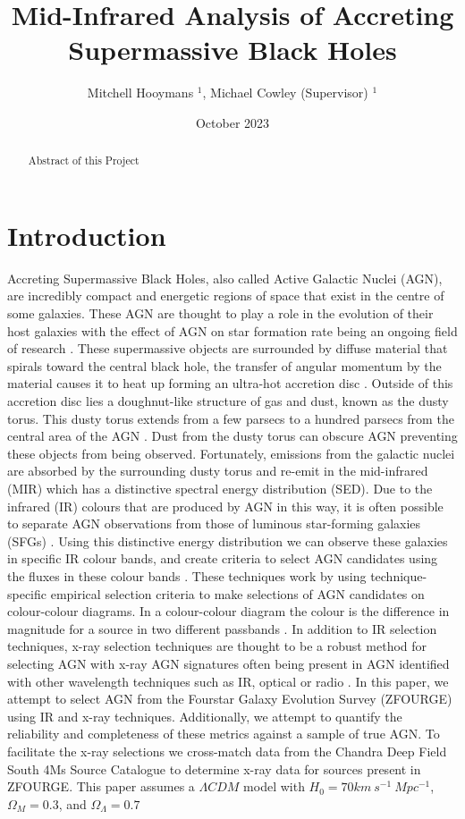 \documentclass[11pt]{iopart}
\date{October 2023}
\begin{document}
\title{Mid-Infrared Analysis of Accreting Supermassive Black Holes}
\author{Mitchell Hooymans $^1$, Michael Cowley (Supervisor) $^1$}
\address{$^1$ Queensland University of Technology, Brisbane, Australia, 4000}

\begin{abstract}
    Abstract of this Project
\end{abstract}

\ioptwocol
\section{Introduction}
Accreting Supermassive Black Holes, also called Active Galactic Nuclei (AGN), are incredibly compact and energetic regions of space that exist in the centre of some galaxies. These AGN are thought to play a role in the evolution of their host galaxies with the effect of AGN on star formation rate being an ongoing field of research \cite{cowley_zfourge_2016}. These supermassive objects are surrounded by diffuse material that spirals toward the central black hole, the transfer of angular momentum by the material causes it to heat up forming an ultra-hot accretion disc \cite{shakura_black_1973}. Outside of this accretion disc lies a doughnut-like structure of gas and dust, known as the dusty torus. This dusty torus extends from a few parsecs to a hundred parsecs from the central area of the AGN \cite{netzer_revisiting_2015}. Dust from the dusty torus can obscure AGN preventing these objects from being observed. Fortunately, emissions from the galactic nuclei are absorbed by the surrounding dusty torus and re-emit in the mid-infrared (MIR) which has a distinctive spectral energy distribution (SED)\cite{lyu_polar_2018}. Due to the infrared (IR) colours that are produced by AGN in this way, it is often possible to separate AGN observations from those of luminous star-forming galaxies (SFGs) \cite{hickox_obscured_2018}. Using this distinctive energy distribution we can observe these galaxies in specific IR colour bands, and create criteria to select AGN candidates using the fluxes in these colour bands \cite{lacy_obscured_2004, stern_midinfrared_2005, donley_identifying_2012, messias_new_2012}. These techniques work by using technique-specific empirical selection criteria to make selections of AGN candidates on colour-colour diagrams. In a colour-colour diagram the colour is the difference in magnitude for a source in two different passbands \cite{bessell_ubvri_1990}. In addition to IR selection techniques, x-ray selection techniques are thought to be a robust method for selecting AGN with x-ray AGN signatures often being present in AGN identified with other wavelength techniques such as IR, optical or radio \cite{brandt_cosmic_2015}. In this paper, we attempt to select AGN from the Fourstar Galaxy Evolution Survey (ZFOURGE) \cite{straatman_fourstar_2016} using IR and x-ray techniques. Additionally, we attempt to quantify the reliability and completeness of these metrics against a sample of true AGN. To facilitate the x-ray selections we cross-match data from the Chandra Deep Field South 4Ms Source Catalogue \cite{xue_chandra_2011} to determine x-ray data for sources present in ZFOURGE. This paper assumes a $\Lambda CDM$ model with $H_0 = 70 km \ s^{-1} \ Mpc^{-1}$, $\Omega_M = 0.3$, and $\Omega_{\Lambda} = 0.7$ 
\end{document}
